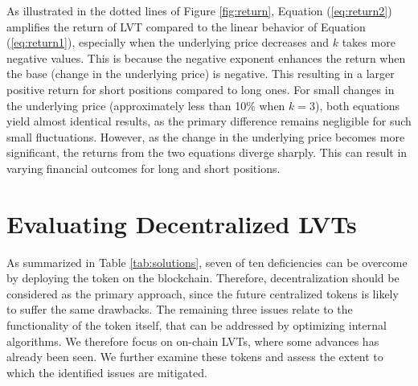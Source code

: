 As illustrated in the dotted lines of Figure \ref{fig:return}, Equation (\ref{eq:return2}) amplifies the return of LVT compared to the linear behavior of Equation (\ref{eq:return1}), especially when the underlying price decreases and \(k\) takes more negative values. This is because the negative exponent enhances the return when the base (\ie change in the underlying price) is negative. This resulting in a larger positive return for short positions compared to long ones. For small changes in the underlying price (\eg approximately less than 10\% when \(k = 3\)), both equations yield almost identical results, as the primary difference remains negligible for such small fluctuations. However, as the change in the underlying price becomes more significant, the returns from the two equations diverge sharply. This can result in varying financial outcomes for long and short positions.

\section{Evaluating Decentralized LVTs}\label{sec:evaluation}
As summarized in Table \ref{tab:solutions}, seven of ten deficiencies can be overcome by deploying the token on the blockchain. Therefore, decentralization should be considered as the primary approach, since the future centralized tokens is likely to suffer the same drawbacks. The remaining three issues relate to the functionality of the token itself, that can be addressed by optimizing internal algorithms. We  therefore focus on on-chain LVTs, where some advances has already been seen. We further examine these tokens and assess the extent to which the identified issues are mitigated.


